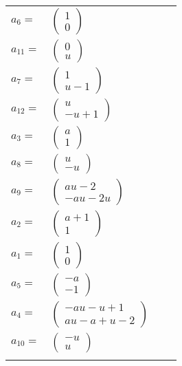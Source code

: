 \documentclass[1p]{elsarticle_modified}
\theoremstyle{definition}
\begin{document}
\begin{tabular}{m{7pt} m{180pt} m{7pt} m{180pt} }
\flushright $a_{6}=$&$\begin{pmatrix}1\\0\end{pmatrix}$ \\
\flushright $a_{11}=$&$\begin{pmatrix}0\\u\end{pmatrix}$ \\
\flushright $a_{7}=$&$\begin{pmatrix}1\\u-1\end{pmatrix}$ \\
\flushright $a_{12}=$&$\begin{pmatrix}u\\- u+1\end{pmatrix}$ \\
\flushright $a_{3}=$&$\begin{pmatrix}a\\1\end{pmatrix}$ \\
\flushright $a_{8}=$&$\begin{pmatrix}u\\- u\end{pmatrix}$ \\
\flushright $a_{9}=$&$\begin{pmatrix}a u-2\\- a u-2 u\end{pmatrix}$ \\
\flushright $a_{2}=$&$\begin{pmatrix}a+1\\1\end{pmatrix}$ \\
\flushright $a_{1}=$&$\begin{pmatrix}1\\0\end{pmatrix}$ \\
\flushright $a_{5}=$&$\begin{pmatrix}- a\\-1\end{pmatrix}$ \\
\flushright $a_{4}=$&$\begin{pmatrix}- a u- u+1\\a u- a+u-2\end{pmatrix}$ \\
\flushright $a_{10}=$&$\begin{pmatrix}- u\\u\end{pmatrix}$\\&\end{tabular}
\end{document}
